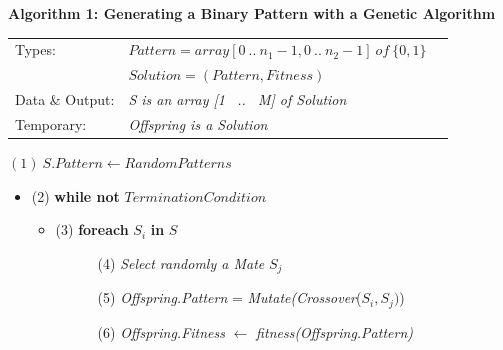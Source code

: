 \documentclass[10pt,a4paper]{article}  %
\begin{document}
\begin{figure}[H]

\begingroup
\parindent0mm  %
\hrulefill

\textbf{Algorithm 1: Generating a Binary Pattern with a Genetic Algorithm}

\vspace{-6pt}
\hrulefill

\par  %

\begin{tabular}{lll} 
Types:          & $Pattern = array [0 ~..~ n_1-1, 0~..~ n_2-1] ~\textit{of}~ \{0,1\}$  \\
                & $Solution = (Pattern, Fitness)$ \\
Data \& Output: & \textit{S is an array [1 ~..~ M] of Solution}  \\
Temporary:      & \textit{Offspring is a Solution}\\
\end{tabular}

\noindent\hrulefill %

%
$(1)~ S.Pattern \leftarrow RandomPatterns$ 

\begin{itemize}
\item []  (2) \textbf{while not} $TerminationCondition$ 
   
    \begin{itemize}  
    \item[] (3) \textbf{foreach} $S_i$ \textbf{in} $S$      
    
    ~~~~~~(4) \textit{Select randomly a Mate} $S_j$     

    ~~~~~~(5) \textit{Offspring.Pattern} = \textit{Mutate(Crossover}($S_i,S_j)$)
      
    ~~~~~~(6) \textit{Offspring.Fitness} $\leftarrow$ \textit{fitness(Offspring.Pattern)} 
  

\end{itemize}
\end{itemize}
\end{figure}
\end{document}

